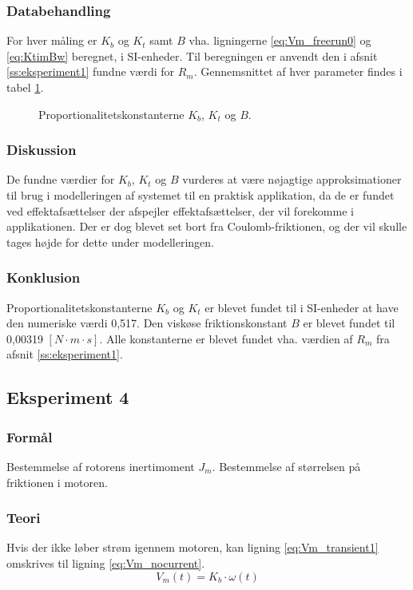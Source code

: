 \subsubsection{Databehandling}
For hver måling er \(K_b\) og \(K_t\) samt \(B\) vha. ligningerne \ref{eq:Vm_freerun0} og \ref{eq:KtimBw} beregnet,
i SI-enheder. Til beregningen er anvendt den i afsnit \ref{ss:eksperiment1} fundne værdi for \(R_m\).
Gennemsnittet af hver parameter findes i tabel \ref{tb:kbktb}.
\begin{figure}[th!]
	\centering
	
	\captionsetup{type=table}
	\caption[Proportionalitetskonstanterne \(K_b\), \(K_t\) og \(B\)]
			{Proportionalitetskonstanterne \(K_b\), \(K_t\) og \(B\).}
	\label{tb:kbktb}
\end{figure}

\subsubsection{Diskussion}
De fundne værdier for \(K_b\), \(K_t\) og \(B\) vurderes at være nøjagtige approksimationer
til brug i modelleringen af systemet til en praktisk applikation, da de er fundet ved effektafsættelser
der afspejler effektafsættelser, der vil forekomme i applikationen.
Der er dog blevet set bort fra Coulomb-friktionen, og der vil skulle tages højde for dette under modelleringen.
\subsubsection{Konklusion}
Proportionalitetskonstanterne \(K_b\) og \(K_t\) er blevet fundet til i SI-enheder at have den numeriske værdi 0,517.
Den viskøse friktionskonstant \(B\) er blevet fundet til 0,00319 \([N \cdot m \cdot s]\).
Alle konstanterne er blevet fundet vha. værdien af \(R_m\) fra afsnit \ref{ss:eksperiment1}.
\subsection{Eksperiment 4}
\subsubsection{Formål}
Bestemmelse af rotorens inertimoment \(J_m\).
Bestemmelse af størrelsen på friktionen i motoren.
\subsubsection{Teori}
Hvis der ikke løber strøm igennem motoren,
kan ligning \ref{eq:Vm_transient1} omskrives til ligning \ref{eq:Vm_nocurrent}.
\begin{equation}
	V_m(t)=K_b\cdot\omega(t)
	\label{eq:Vm_nocurrent}
 \end{equation}

